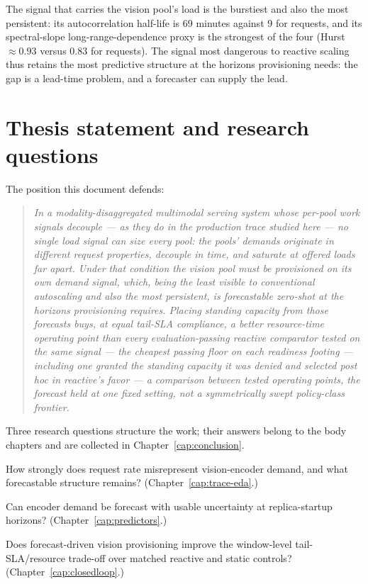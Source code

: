 The signal that carries the vision pool's load is the burstiest and also the
most persistent: its autocorrelation half-life is 69 minutes against 9
for requests, and its spectral-slope long-range-dependence proxy is the
strongest of the four (Hurst ${\approx}0.93$ versus $0.83$ for requests).
The signal most dangerous to reactive scaling thus retains the most
predictive structure at the horizons provisioning needs: the gap is a
lead-time problem, and a forecaster can supply the lead.

\section{Thesis statement and research questions}
\label{sec:intro-thesis}

The position this document defends:

\begin{quote}
\itshape In a modality-disaggregated multimodal serving system whose
per-pool work signals decouple --- as they do in the production trace
studied here --- no single
load signal can size every pool: the pools' demands originate in different
request properties, decouple in time, and saturate at offered loads far
apart. Under that condition the vision pool must be provisioned on its own
demand signal, which, being the least visible to conventional autoscaling and
also the most persistent, is forecastable zero-shot at the horizons
provisioning requires. Placing standing capacity from those forecasts buys,
at equal tail-SLA compliance, a better resource-time operating point than
every \emph{evaluation-passing} reactive comparator tested on the same signal
--- the cheapest passing floor on each readiness footing --- including one granted
the standing capacity it was denied and selected \emph{post hoc} in
reactive's favor --- a comparison between tested operating points, the
forecast held at one fixed setting, not a symmetrically swept policy-class
frontier.
\end{quote}

Three research questions structure the work; their answers belong to the
body chapters and are collected in Chapter~\ref{cap:conclusion}.

\begin{description}\setlength{\itemsep}{1pt}\setlength{\parskip}{0pt}
\item[RQ1 --- Demand adequacy.] How strongly does request rate misrepresent
vision-encoder demand, and what forecastable structure remains?
(Chapter~\ref{cap:trace-eda}.)

\item[RQ2 --- Operational forecastability.] Can encoder demand be forecast
with usable uncertainty at replica-startup horizons?
(Chapter~\ref{cap:predictors}.)

\item[RQ3 --- Control payoff.] Does forecast-driven vision provisioning
improve the window-level tail-SLA/resource trade-off over matched reactive
and static controls? (Chapter~\ref{cap:closedloop}.)
\end{description}

